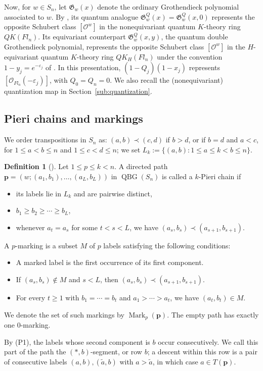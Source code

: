 \documentclass[11pt,a4paper,reqno]{amsart}
\DeclareRobustCommand{\rev}[1]{{\color{revision}#1}}
\numberwithin{equation}{section}
\theoremstyle{definition}
\newtheorem{definition}[theorem]{Definition}
\DeclareMathOperator{\QBG}{QBG}
\DeclareMathOperator{\Mark}{Mark}
\newcommand{\OO}{\mathcal O}
\newcommand{\Sc}[1]{[\OO^{#1}]}
\newcommand{\pp}{\mathbf p}
\newcommand{\eps}{\varepsilon}
\newcommand{\GG}{\mathfrak G}
\begin{document}
Now, for \(w \in S_n\), let \(\GG_w(x)\) denote the ordinary Grothendieck polynomial associated to \(w\). By \cite[Theorem~51]{LNS}, its quantum analogue \(\GG_w^Q(x)=\GG_w^Q(x,0)\) represents the opposite Schubert class \(\Sc{w}\) in the nonequivariant quantum \(K\)-theory ring \(QK(Fl_n)\). Its equivariant counterpart \(\GG_w^Q(x,y)\), the quantum double Grothendieck polynomial, represents the opposite Schubert class \(\Sc{w}\) in the \(H\)-equivariant quantum \(K\)-theory ring \(QK_H(Fl_n)\) under the convention \(1-y_j=e^{-\eps_j}\) of \cite[Theorem~4.4]{MNS2}. In this presentation,  \((1-Q_j)(1-x_j)\) represents \([\OO_{Fl_n}(-\eps_j)]\), with \(Q_0=Q_n=0\). We also recall the (nonequivariant) quantization map in Section~\ref{sub:quantization}.

\subsection{Pieri chains and markings}
We order transpositions in \(S_n\) as: \((a,b)\prec(c,d)\) if \(b>d\), or if \(b=d\) and \(a<c\), for \(1 \le a < b \le n\) and \(1 \le c < d \le n\); we set \(L_k:=\{(a,b):1\le a\le k<b\le n\}\).
\begin{definition}[\cite{LeM}]\label{def:pieri}
Let \(1 \le p \le k < n\). A directed path \(\pp=(w;(a_1,b_1),\ldots,(a_L,b_L))\) in \(\QBG(S_n)\) is called a \(k\)-Pieri chain if
\begin{itemize}
\item[(P0)] its labels lie in \(L_k\) and are pairwise distinct,
\item[(P1)] \(b_1\ge b_2\ge\cdots\ge b_L\),
\item[(P2)] whenever \(a_t=a_s\) for some \(t<s<L\), we have \((a_s,b_s)\prec(a_{s+1},b_{s+1})\).
\end{itemize}
A \(p\)-marking is a subset \(M\) of \(p\) labels satisfying the following conditions:
\begin{itemize}
\item[(M1)] A marked label is the first occurrence of its first component.
\item[(M2)] If \((a_s,b_s)\notin M\) and \(s<L\), then \((a_s,b_s)\prec(a_{s+1},b_{s+1})\).
\item[(M3)] For every \(t\ge1\) with \(b_1=\cdots=b_t\) and \(a_1>\cdots>a_t\), we have \((a_t,b_t)\in M\).
\end{itemize}
We denote the set of such markings by \(\Mark_p(\pp)\). The empty path has exactly one \(0\)-marking.
\end{definition}
\rev{By (P1), the labels whose second component is \(b\) occur consecutively. We call this part of the path the \((*,b)\)-segment, or row \(b\); a descent within this row is a pair of consecutive labels \((a,b),(\tilde a,b)\) with \(a>\tilde a\), in which case \(a\in T(\pp)\).}
\end{document}
